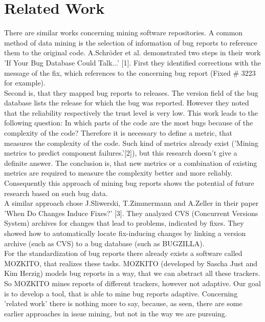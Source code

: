 \documentclass[12pt,a4paper,final]{article}
\begin{document}
\section{Related Work}
There are similar works concerning mining software repositories. A common method of data mining is the selection of information of bug reports to reference them to the original code. A.Schröder et al. demonstrated two steps in their work 'If Your Bug Database Could Talk...' [1]. First they identified corrections with the message of the fix, which references to the concerning bug report (Fixed \# 3223 for example).\\ Second is, that they mapped bug reports to releases. The version field of the bug database lists the release for which the bug was reported. However they noted that the reliability respectively the trust level is very low. This work leads to the following question: In which parts of the code are the most bugs because of the complexity of the code? Therefore it is necessary to define a metric, that measures the complexity of the code. Such kind of metrics already exist ('Mining metrics to predict
component failures.'[2]), but this research doesn't give a definite answer. The conclusion is, that new metrics or a combination of existing metrics are required to measure the complexity better and more reliably. Consequently this approach of mining bug reports shows the potential of future research based on such bug data.\\ A similar approach chose J.Sliwerski, T.Zimmermann and A.Zeller in their paper 'When Do Changes Induce Fixes?' [3]. They analyzed CVS (Concurrent Versions System) archives for changes that lead to problems, indicated by fixes. They showed how to automatically locate fix-inducing changes by linking a version archive (such as CVS) to a bug database (such as BUGZILLA).\\ 
For the standardization of bug reports there already exists a software called MOZKITO, that realizes these tasks. MOZKITO (developed by Sascha Just and Kim Herzig) models bug reports in a way, that we can abstract all these trackers. So MOZKITO mines reports of different trackers, however not adaptive. Our goal is to develop a tool, that is able to mine bug reports adaptive. Concerning 'related work' there is nothing more to say, because, as seen, there are some earlier approaches in issue mining, but not in the way we are pursuing. 
\end{document}
